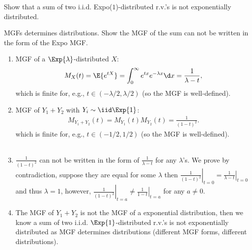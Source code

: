 \begin{exercise} 
	Show that a sum of two i.i.d. Expo($1$)-distributed r.v.'s is not exponentially distributed.
	\begin{hint} 
		MGFs determines distributions. Show the MGF of the sum can not be written in the form of the Expo MGF. 
	\end{hint}
	\begin{solution}
		\begin{enumerate}
			\item   MGF of a $\Exp{\lambda}$-distributed $X$: $$M_X(t)=\E{e^{tX}}=\int_{0}^{\infty} e^{tx}e^{-\lambda x} \d x=  \frac{1}{\lambda -t},$$ {which is finite for, e.g., $t\in (-\lambda/2, \lambda/2)$ (so the MGF is well-defined)}.
			\item {MGF of $Y_1+Y_2$} with $Y_i\sim \iid \Exp{1}$: 
			\begin{align*}
				M_{Y_1+Y_2}(t) = M_{Y_1}(t)M_{Y_2}(t)=\frac{1}{(1 -t)^2}.
			\end{align*}
			{which is finite for, e.g., $t\in (-1/2, 1/2)$ (so the MGF is well-defined).}\\~\\
			\item $\frac{1}{(1 -t)^2}$ can not be written in the form of $\frac{1}{\lambda -t}$ for any $\lambda$'s. We prove by contradiction, suppose they are equal for some $\lambda$ then $\left.\frac{1}{(1 -t)^2}\right|_{t=0}=\left.\frac{1}{\lambda -t}\right|_{t=0}$ and thus $\lambda=1$, however, $\left.\frac{1}{(1 -t)^2}\right|_{t=a}\neq \left.\frac{1}{1 -t}\right|_{t=a}$ for any $a\neq 0$.
			\item {The MGF of  $Y_1+Y_2$ is not the MGF of a exponential distribution}, then we know  a sum of two i.i.d. $\Exp{1}$-distributed r.v.'s is not exponentially distributed as MGF determines distributions (different MGF forms, different distributions).
		\end{enumerate}
	\end{solution}
\end{exercise}

